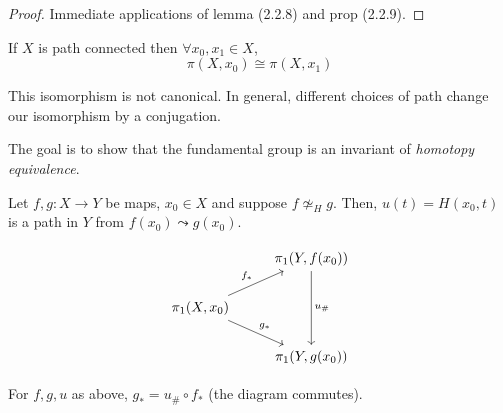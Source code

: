 \documentclass{article}
\numberwithin{nthm}{subsection}
\begin{document}
\begin{proof}
    Immediate applications of lemma (2.2.8) and prop (2.2.9).
\end{proof}

\begin{cor}
    If $X$ is path connected then $\forall x_0, x_1 \in X$,
    \begin{equation*}
        \pi(X, x_0) \cong \pi(X, x_1)
    \end{equation*}
\end{cor}

\begin{warning}
    This isomorphism is not canonical. In general, different choices of path change our isomorphism by a conjugation.
\end{warning}

The goal is to show that the fundamental group is an invariant of \emph{homotopy equivalence}.

Let $f, g: X \to Y$ be maps, $x_0 \in X$ and suppose $f \not\simeq_{H} g$. Then, $u(t) = H(x_0, t)$ is a path in $Y$ from $f(x_0) \leadsto g(x_0)$.

\begin{equation*}
    \begin{tikzcd}
        & \pi_1(Y, f(x_0)) \arrow[dd, "u_{\#}"]\\
        \pi_1(X, x_0) \arrow[ur, "f_*"] \arrow[dr, "g_*"] & \\
                                                          & \pi_1(Y, g(x_0))
    \end{tikzcd}
\end{equation*}

\begin{lemma}
    For $f, g, u$ as above, $g_* = u_{\#} \circ f_*$ (the diagram commutes).
\end{lemma}
\end{document}
